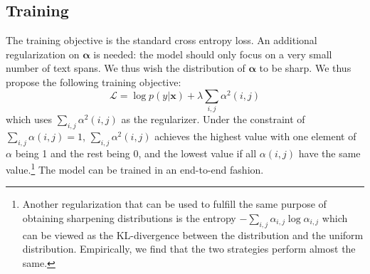\documentclass[11pt,a4paper]{article}
\begin{document}
\subsection{Training}
The training objective is the standard cross entropy loss. An additional regularization on $\bm{\alpha}$ is needed:  
the model should only focus on 
 a very small number of text spans. We thus wish the distribution of $\bm{\alpha}$ to be sharp. 
  We thus propose the following training objective:
 \begin{equation}
 \mathcal{L} = \log p(y|\bm{x}) + \lambda\sum_{i,j} \alpha^2(i,j)
 \label{objective}
 \end{equation}
which uses $\sum_{i,j} \alpha^2(i,j)$ as the regularizer. Under the constraint of $\sum_{i,j} \alpha(i,j)=1$, $\sum_{i,j} \alpha^2(i,j)$ achieves the highest value with one element of $\alpha$ being 1 and the rest being 0, and the lowest value if all $\alpha(i,j)$ have the same value.\footnote{Another regularization that can be used to fulfill the same purpose
of obtaining sharpening distributions 
 is the entropy $-\sum_{i,j} \alpha_{i,j}\log \alpha_{i,j}$ which can be viewed as the KL-divergence between the distribution and the uniform distribution. Empirically, we find that the two strategies perform almost the same.}
 The model  can be trained in an end-to-end fashion.
 \begin{comment}
  in two different ways: the end-to-end fashion and the pipelined fashion. 
For the former, we 
can directly train Eq.\ref{objective} in an end-to-end fashion, and use $\alpha(i,j)$ for interpretation. 
For the latter,
we can  first train a model based on vanilla transformers, BiLSTMs or CNNs to optimize $p(y|\bm{x})$,
 where the SIC layer and the interpretation layer are not used.
Next, we fix the input layer and the intermediate layers and only update parameters for the SIC layer and the interpretation layer based on Eq.\ref{objective}. 
\end{comment}
\end{document}
